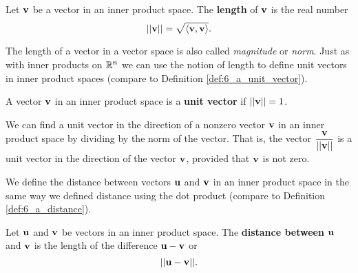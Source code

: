 \begin{definition} Let $\mathbf{v}$ be a vector in an inner product space. The \textbf{length} of $\mathbf{v}$ is the real number
\[||\mathbf{v}|| = \sqrt{\langle \mathbf{v}, \mathbf{v} \rangle}.\]
\end{definition}

The length of a vector in a vector space is also called \emph{magnitude} or \emph{norm}. Just as with inner products on $\mathbb{R}^n$ we can use the notion of length to define unit vectors in inner product spaces (compare to Definition \ref{def:6_a_unit_vector}).  

\begin{definition} A vector $\mathbf{v}$ in an inner product space is a \textbf{unit vector} if $||\mathbf{v}|| = 1$.
\end{definition}

We can find a unit vector in the direction of a nonzero vector $\mathbf{v}$ in an inner product space by dividing by the norm of the vector. That is, the vector $\displaystyle \frac{\mathbf{v}}{||\mathbf{v}||}$ is a unit vector in the direction of the vector $\mathbf{v}$, provided that $\mathbf{v}$ is not zero. 

We define the distance between vectors $\mathbf{u}$ and $\mathbf{v}$ in an inner product space  in the same way we defined distance using the dot product (compare to Definition \ref{def:6_a_distance}).

\begin{definition} Let $\mathbf{u}$ and $\mathbf{v}$ be vectors in an inner product space. The \textbf{distance between} $\mathbf{u}$ and $\mathbf{v}$ is the length of the difference $\mathbf{u} - \mathbf{v}$ or
\[|| \mathbf{u} - \mathbf{v} ||.\]
\end{definition}


